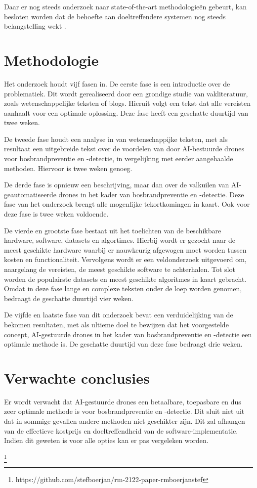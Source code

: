 \documentclass{hogent-article}
\begin{document}
Daar er nog steeds onderzoek naar state-of-the-art methodologieën gebeurt, kan besloten worden dat de behoefte aan doeltreffendere systemen nog steeds belangstelling wekt \autocite{Moumgiakmas2021}.

\section{Methodologie}
Het onderzoek houdt vijf fasen in. De eerste fase is een introductie over de problematiek. Dit wordt gerealiseerd door een grondige studie van vakliteratuur, zoals wetenschappelijke teksten of blogs. Hieruit volgt een tekst dat alle vereisten aanhaalt voor een optimale oplossing. Deze fase heeft een geschatte duurtijd van twee weken.

De tweede fase houdt een analyse in van wetenschappijke teksten, met als resultaat een uitgebreide tekst over de voordelen van door AI-bestuurde drones voor bosbrandpreventie en -detectie, in vergelijking met eerder aangehaalde methoden. 
Hiervoor is twee weken genoeg.

De derde fase is opnieuw een beschrijving, maar dan over de valkuilen van AI-geautomatiseerde drones in het kader van bosbrandpreventie en -detectie.
Deze fase van het onderzoek brengt alle mogenlijke tekortkomingen in kaart.
Ook voor deze fase is twee weken voldoende.

De vierde en grootste fase bestaat uit het toelichten van de beschikbare hardware, software, datasets en algortimes. Hierbij wordt er gezocht naar de meest geschikte hardware waarbij er nauwkeurig afgewogen moet worden tussen kosten en functionaliteit. Vervolgens wordt er een veldonderzoek uitgevoerd om, naargelang de vereisten, de meest geschikte software te achterhalen. Tot slot worden de populairste datasets en meest geschikte algoritmes in kaart gebracht.
Omdat in deze fase lange en complexe teksten onder de loep worden genomen,  bedraagt de geschatte duurtijd vier weken.


De vijfde en laatste fase van dit onderzoek bevat een verduidelijking van de bekomen resultaten, met als ultieme doel te bewijzen dat het voorgestelde concept, AI-gestuurde drones in het kader van bosbrandpreventie en -detectie een optimale methode is. De geschatte duurtijd van deze fase bedraagt drie weken.

\section{Verwachte conclusies}
Er wordt verwacht dat AI-gestuurde drones een betaalbare, toepasbare en dus zeer optimale methode is voor bosbrandpreventie en -detectie. Dit sluit niet uit dat in sommige gevallen andere methoden niet geschikter zijn. Dit zal afhangen van de effectieve kostprijs en doeltreffendheid van de software-implementatie. Indien dit geweten is voor alle opties kan er pas vergeleken worden.



\printbibliography[heading=bibintoc]
\footnote{https://github.com/stefboerjan/rm-2122-paper-rmboerjanstef}
\end{document}
